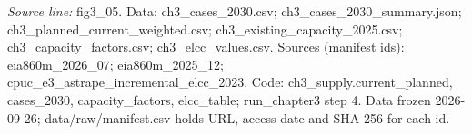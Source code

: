 {\scriptsize\textit{Source line:} fig3\_\allowbreak{}05. Data: ch3\_\allowbreak{}cases\_\allowbreak{}2030.csv; ch3\_\allowbreak{}cases\_\allowbreak{}2030\_\allowbreak{}summary.json; ch3\_\allowbreak{}planned\_\allowbreak{}current\_\allowbreak{}weighted.csv; ch3\_\allowbreak{}existing\_\allowbreak{}capacity\_\allowbreak{}2025.csv; ch3\_\allowbreak{}capacity\_\allowbreak{}factors.csv; ch3\_\allowbreak{}elcc\_\allowbreak{}values.csv. Sources (manifest ids): eia860m\_\allowbreak{}2026\_\allowbreak{}07; eia860m\_\allowbreak{}2025\_\allowbreak{}12; cpuc\_\allowbreak{}e3\_\allowbreak{}astrape\_\allowbreak{}incremental\_\allowbreak{}elcc\_\allowbreak{}2023. Code: ch3\_\allowbreak{}supply.current\_\allowbreak{}planned, cases\_\allowbreak{}2030, capacity\_\allowbreak{}factors, elcc\_\allowbreak{}table; run\_\allowbreak{}chapter3 step 4. Data frozen 2026-09-26; data/raw/manifest.csv holds URL, access date and SHA-256 for each id.}